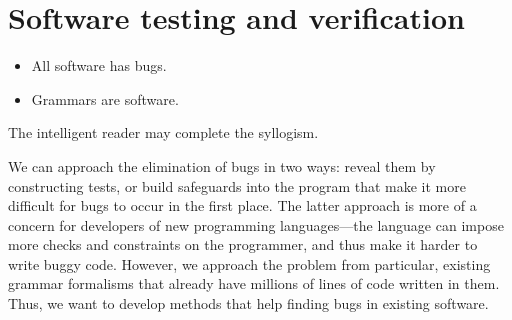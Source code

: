 \section{Software testing and verification}
\label{sec:testing-intro} 

\begin{itemize}
\item All software has bugs.
\item Grammars are software.
\end{itemize}

\noindent The intelligent reader may complete the syllogism.

We can approach the elimination of bugs in two ways: reveal them
by constructing tests, or build safeguards into the program that
make it more difficult for bugs to occur in the first place. The
latter approach is more of a concern for developers of new programming
languages---the language can impose more checks and constraints on the
programmer, and thus make it harder to write buggy code. However, we
approach the problem from particular, existing grammar formalisms that
already have millions of lines of code written in them. Thus, we want
to develop methods that help finding bugs in existing software.





